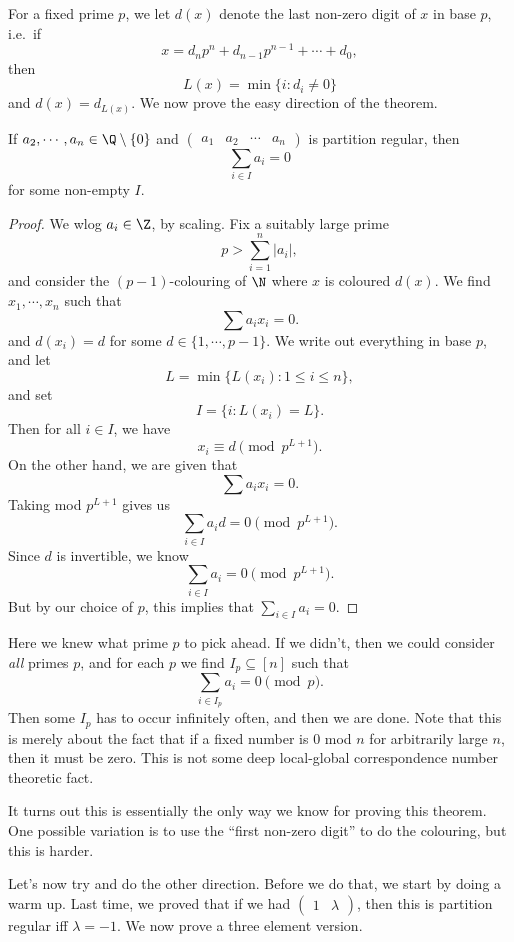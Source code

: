 \documentclass[a4paper]{article}
\begin{document}
For a fixed prime $p$, we let $d(x)$ denote the last non-zero digit of $x$ in base $p$, i.e.\ if
\[
  x = d_n p^n + d_{n - 1}p^{n - 1} + \cdots + d_0,
\]
then
\[
  L(x) = \min\{i: d_i \not= 0\}
\]
and $d(x) = d_{L(x)}$. We now prove the easy direction of the theorem.

\begin{prop}
  If $a_2, \cdots, a_n \in \Q \setminus \{0\}$ and $\begin{pmatrix}a_1 & a_2 & \cdots & a_n\end{pmatrix}$ is partition regular, then
  \[
    \sum_{i \in I} a_i = 0
  \]
  for some non-empty $I$.
\end{prop}

\begin{proof}
  We wlog $a_i \in \Z$, by scaling. Fix a suitably large prime
  \[
    p > \sum_{i = 1}^n |a_i|,
  \]
  and consider the $(p - 1)$-colouring of $\N$ where $x$ is coloured $d(x)$. We find $x_1, \cdots, x_n$ such that
  \[
    \sum a_i x_i = 0.
  \]
  and $d(x_i) = d$ for some $d \in \{1, \cdots, p - 1\}$. We write out everything in base $p$, and let
  \[
    L = \min \{L(x_i): 1 \leq i \leq n\},
  \]
  and set
  \[
    I = \{i: L(x_i) = L\}.
  \]
  Then for all $i \in I$, we have
  \[
    x_i \equiv d \pmod {p^{L + 1}}.
  \]
  On the other hand, we are given that
  \[
    \sum a_i x_i = 0.
  \]
  Taking mod $p^{L + 1}$ gives us
  \[
    \sum_{i \in I} a_i d = 0 \pmod {p^{L + 1}}.
  \]
  Since $d$ is invertible, we know
  \[
    \sum_{i \in I} a_i = 0 \pmod {p^{L + 1}}.
  \]
  But by our choice of $p$, this implies that $\sum_{i \in I} a_i = 0$.
\end{proof}
Here we knew what prime $p$ to pick ahead. If we didn't, then we could consider \emph{all} primes $p$, and for each $p$ we find $I_p \subseteq [n]$ such that
\[
  \sum_{i \in I_p} a_i = 0 \pmod p.
\]
Then some $I_p$ has to occur infinitely often, and then we are done. Note that this is merely about the fact that if a fixed number is $0$ mod $n$ for arbitrarily large $n$, then it must be zero. This is not some deep local-global correspondence number theoretic fact.

It turns out this is essentially the only way we know for proving this theorem. One possible variation is to use the ``first non-zero digit'' to do the colouring, but this is harder.

Let's now try and do the other direction. Before we do that, we start by doing a warm up. Last time, we proved that if we had $\begin{pmatrix}1 & \lambda\end{pmatrix}$, then this is partition regular iff $\lambda = -1$. We now prove a three element version.
\end{document}

